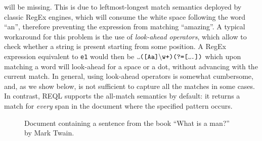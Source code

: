 will be missing. This is due to leftmost-longest match semantics deployed by
classic RegEx engines, which will consume the white space following the word
``an'', therefore preventing the expression from matching ``amazing''. A typical
workaround for this problem is the use of \emph{look-ahead operators}, which
allow to check whether a string is present starting from some position. A RegEx
expression equivalent to \texttt{e1} would then be $\Vtextvisiblespace
\texttt{([Aa]}\backslash \texttt{w+)(?=[}\Vtextvisiblespace \texttt{.])}$ which
upon matching a word will look-ahead for a space or a dot, without advancing
with the current match. In general, using look-ahead operators is somewhat
cumbersome, and, as we show below, is not sufficient to capture all the matches
in some cases. In contrast, REQL supports the all-match semantics by default: it
returns a match for \emph{every} span in the document where the specified
pattern occurs.


\begin{figure}
	\begin{center}
	\end{center}
	\vspace*{-7mm}
	\caption{Document containing a sentence from the book ``What is a man?'' by Mark Twain.}
	\label{fig-doc2}
\end{figure}

